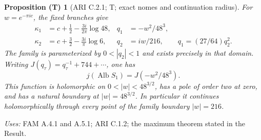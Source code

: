 \documentclass[11pt,a4paper]{article}
\theoremstyle{plain}
\newtheorem{proposition}[theorem]{Proposition (T)}
\theoremstyle{definition}
\begin{document}
\begin{proposition}[ARI C.2.1; T; exact nomes and continuation radius]\label{ari:C.2.1}
For $w=e^{-\pi ic}$, the fixed branches give
\begin{align*}
 \kappa_1&=c+\tfrac12-\frac{3i}{2\pi}\log48,&
 q_1&=-w^2/48^3,\\
 \kappa_2&=c+\tfrac32-\frac{3i}{\pi}\log6,&
 q_2&=iw/216,\qquad q_1=(27/64)q_2^2.
\end{align*}
The family is parameterized by $0<|q_2|<1$ and exists precisely in
that domain. Writing $J(q_\tau)=q_\tau^{-1}+744+\cdots$, one has
\[
 j(\operatorname{Alb}S_1)=J(-w^2/48^3).
\]
This function is holomorphic on $0<|w|<48^{3/2}$, has a pole of order
two at zero, and has a natural boundary at $|w|=48^{3/2}$.
In particular it continues holomorphically through every point of the
family boundary $|w|=216$.
\end{proposition}
\noindent\textit{Uses:} FAM A.4.1 and A.5.1; ARI C.1.2; the maximum theorem stated in the Result.\par
\end{document}
